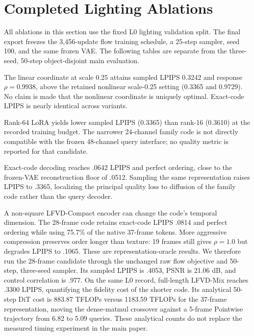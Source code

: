 \section{Completed Lighting Ablations}
\label{sec:supp_full_ablations}
All ablations in this section use the fixed L0 lighting validation split.
The final export freezes the 3,456-update flow training schedule, a
25-step sampler, seed 100, and the same frozen VAE. The following tables
are separate from the three-seed, 50-step object-disjoint main evaluation.


The linear coordinate at scale 0.25 attains sampled LPIPS 0.3242 and
response $\rho=0.9938$, above the retained nonlinear scale-0.25 setting
(0.3365 and 0.9729). No claim is made that the nonlinear coordinate is
uniquely optimal. Exact-code LPIPS is nearly identical across variants.


Rank-64 LoRA yields lower sampled LPIPS (0.3365) than rank-16 (0.3610)
at the recorded training budget. The narrower 24-channel family code is
not directly compatible with the frozen 48-channel query interface;
no quality metric is reported for that candidate.


Exact-code decoding reaches .0642 LPIPS and perfect ordering, close to the
frozen-VAE reconstruction floor of .0512. Sampling the same representation
raises LPIPS to .3365, localizing the principal quality loss to diffusion of
the family code rather than the query decoder.


A non-square LFVD-Compact encoder can change the code's temporal dimension.
The 28-frame code retains exact-code LPIPS .0814 and perfect
ordering while using 75.7\% of the native 37-frame tokens. More aggressive
compression preserves order longer than texture: 19 frames still gives
$\rho=1.0$ but degrades LPIPS to .1065.  These are representation-oracle
results.  We therefore run the 28-frame candidate through the unchanged raw
flow objective and 50-step, three-seed sampler. Its sampled LPIPS is .4053,
PSNR is 21.06 dB, and control correlation is .977. On the same L0 record,
full-length LFVD-Mix reaches .3300 LPIPS, quantifying the fidelity cost of the
shorter code. Its analytical 50-step DiT
cost is 883.87 TFLOPs versus
1183.59 TFLOPs for the 37-frame representation, moving the dense-matmul
crossover against a 5-frame Pointwise trajectory from 6.82 to 5.09 queries.
These analytical counts do not replace the measured timing experiment in the
main paper.

